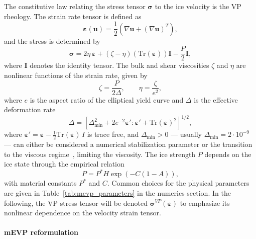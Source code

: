 \documentclass[11pt]{article}
\newcommand{\bu}{\mathbf{u}}
\newcommand{\bI}{\mathbf{I}}
\newcommand{\sig}{\boldsymbol{\sigma}}
\newcommand{\beps}{\boldsymbol{\varepsilon}}
\newcommand{\Tr}{\text{Tr}}
\begin{document}
The constitutive law relating the stress tensor $\sig$ to the
ice velocity is the VP rheology. The strain rate tensor is defined as
\begin{equation}
  \beps(\bu)
  = \frac{1}{2}\left(\nabla \bu+ (\nabla \bu)^T\right),
  \label{eq:strain}
\end{equation}
%
and the stress is determined by
%
\begin{equation}
  \sig
  = 2\eta\,\beps
  + (\zeta - \eta)(\Tr(\beps))\bI
  - \frac{P}{2}\bI,
  \label{eq:stress}
\end{equation}
where $\boldsymbol{I}$ denotes the identity tensor. The bulk and shear
viscosities $\zeta$ and $\eta$ are nonlinear functions of the strain rate,
given by
%
\begin{equation}
  \zeta = \frac{P}{2\Delta}, \qquad \eta = \frac{\zeta}{e^2},
  \label{eq:viscosities}
\end{equation}
%
where $e$ is the aspect ratio of the elliptical yield curve and $\Delta$ is the effective deformation rate
%
\begin{equation}
  \Delta = \left[
  \Delta_\text{min}^2 + 2e^{-2}\beps':\beps'+\Tr(\beps)^2\right]^{1/2},
  \label{eq:Delta}
\end{equation}
where $\beps' = \beps-\frac{1}{2}\text{Tr}(\beps)\,I$ is trace free, and $\Delta_\text{min}>0$ --- usually $\Delta_\text{min}=2\cdot 10^{-9}$ --- can either be considered a numerical stabilization parameter or the transition to the viscous regime~\cite{Hibler1979}, limiting the viscosity. 
The ice strength $P$ depends on the ice state through the empirical relation
%
\begin{equation}
  P = P^* H \exp\!\left(-C(1 - A)\right),
  \label{eq:icestrength}
\end{equation}
%
with material constants $P^*$ and $C$. Common choices for the physical parameters are given in Table~\ref{tab:mevp_parameters} in the numerics section. In the following, the VP stress tensor will be denoted $\sig^{VP}(\beps)$ to emphasize its nonlinear dependence on the velocity strain tensor.

\paragraph{mEVP reformulation}
\end{document}
